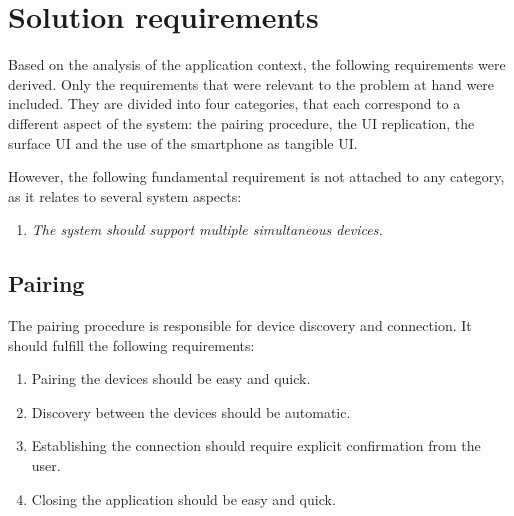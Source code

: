 \section{Solution requirements}
\label{sec:requirements}

Based on the analysis of the application context, the following requirements were derived.
Only the requirements that were relevant to the problem at hand were included.
They are divided into four categories, that each correspond to a different aspect of the system: the pairing procedure, the UI replication, the surface UI and the use of the smartphone as tangible UI.

However, the following fundamental requirement is not attached to any category, as it relates to several system aspects:
\begin{enumerate}[{R}-1]
\item \emph{The system should support multiple simultaneous devices.}
\end{enumerate}

\subsection{Pairing}

The pairing procedure is responsible for device discovery and connection.
It should fulfill the following requirements:

\label{RA}
\begin{enumerate}[{RA}-1]
\item Pairing the devices should be easy and quick.
\item Discovery between the devices should be automatic.
\item Establishing the connection should require explicit confirmation from the user.
\item Closing the application should be easy and quick.
\end{enumerate}



